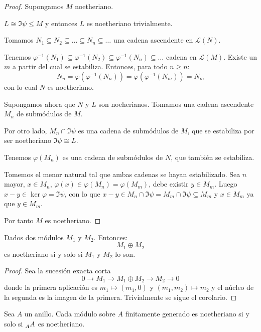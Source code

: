 \begin{proof}
  Supongamos \(M\) noetheriano.

  \(L\cong \Im\psi\le M\) y entonces \(L\) es noetheriano trivialmente.

  Tomamos \(N_1\subseteq N_2\subseteq\ldots\subseteq N_n\subseteq\ldots\)
  una cadena ascendente en \(\mathcal{L}(N)\).

  Tenemos \(\varphi^{-1}(N_1)\subseteq \varphi^{-1}(N_2)
  \subseteq \varphi^{-1}(N_n)\subseteq\ldots\)
  cadena en \(\mathcal{L}(M)\). Existe un \(m\) a partir del cual
  se estabiliza. Entonces, para todo \(n\ge n\):
  \[
    N_n=\varphi(\varphi^{-1}(N_n))=\varphi(\varphi^{-1}(N_m))=N_m
  \]
  con lo cual \(N\) es noetheriano.


  Supongamos ahora que \(N\) y \(L\) son noeherianos.
  Tomamos una cadena ascendente \(M_n\) de submódulos de \(M\).

  Por otro lado, \(M_n\cap\Im\psi\) es una cadena de submódulos de
  \(M\), que se estabiliza por ser noetheriano \(\Im\psi\cong L\).

  Tenemos \(\varphi(M_n)\) es una cadena de submódulos de \(N\),
  que también se estabiliza.

  Tomemos el menor natural tal que ambas cadenas se hayan estabilizado.
  Sea \(n\) mayor, \(x\in M_n\), \(\varphi(x)\in\varphi(M_n)
  =\varphi(M_m)\), debe existir \(y\in M_m\). Luego \(x-y\in\ker\varphi
  =\Im\psi\), con lo que \(x-y\in M_n\cap\Im\psi=M_m\cap\Im\psi\subseteq M_m\)
  y \(x\in M_m\) ya que \(y\in M_m\).

  Por tanto \(M\) es noetheriano.
\end{proof}

\begin{cor}
  Dados dos módulos \(M_1\) y \(M_2\).
  Entonces:
  \[
    M_1\oplus M_2
  \]
  es noetheriano si y solo si \(M_1\) y \(M_2\) lo son.
\end{cor}

\begin{proof}
  Sea la sucesión exacta corta
  \[
    0\longrightarrow M_1\longrightarrow M_1\oplus M_2\longrightarrow M_2
    \longrightarrow 0
  \]
  donde la primera aplicación es \(m_1\mapsto(m_1,0)\)
  y \((m_1,m_2)\mapsto m_2\) y el núcleo de la segunda es la imagen de
  la primera. Trivialmente se sigue el corolario.
\end{proof}

\begin{teo}
  Sea \(A\) un anillo. Cada módulo sobre \(A\) finitamente generado
  es noetheriano si y solo si \(\prescript{}{A}{A}\) es noetheriano.
\end{teo}

